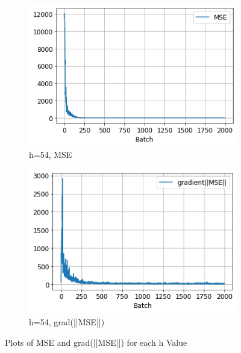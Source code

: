 \documentclass{homework}
\begin{document}
\begin{figure}[H]
\medskip
\begin{subfigure}{0.4\textwidth}
\includegraphics[width=\linewidth]{h54_MSE.png}
\caption{h=54, MSE} \label{fig:g}
\end{subfigure}\hspace*{\fill}
\begin{subfigure}{0.4\textwidth}
\includegraphics[width=\linewidth]{h54_gradient.png}
\caption{h=54, grad(||MSE||)} \label{fig:h}
\end{subfigure}

\caption{Plots of MSE and grad(||MSE||) for each h Value} \label{batch_evo}
\end{figure} \newpage
\end{document}
